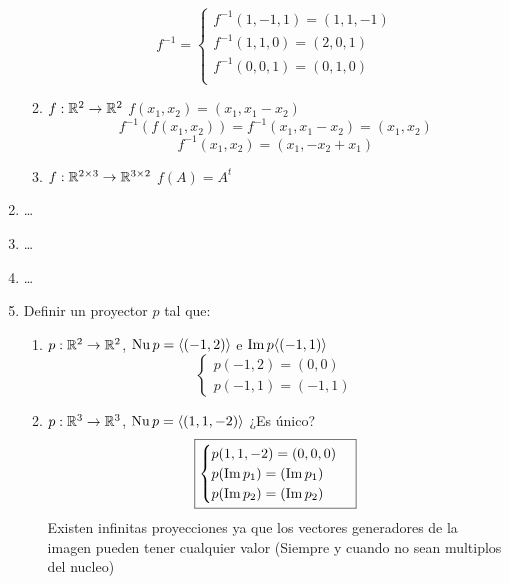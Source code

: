\documentclass[../practica.root.tex]{subfiles}
\begin{document}
\begin{enumerate}
\begin{enumerate}
                    \[
                        \boxed{
                            f^{-1} =
                            \begin{cases}
                                f^{-1}(1,-1,1) = (1,1,-1) \\
                                f^{-1}(1,1,0) = (2,0,1)   \\
                                f^{-1}(0,0,1) = (0,1,0)   \\
                            \end{cases}
                        }
                    \]
              \item $ f : \mathbb{R}^2 \to \mathbb{R}^2 $ $ f(x_1,x_2) = (x_1,x_1-x_2) $
                    \[ f^{-1}(f(x_1,x_2)) = f^{-1}(x_1, x_1 - x_2) = (x_1, x_2) \]
                    \[ \boxed{f^{-1}(x_1, x_2) = (x_1, -x_2 + x_1) } \]
              \item $ f : \mathbb{R}^{2\times3} \to \mathbb{R}^{3\times2} $ $ f(A) = A^t $
          \end{enumerate}
    \item \dots
    \item \dots
    \item \dots
    \item Definir un proyector $p$ tal que:
          \begin{enumerate}
              \item $ p : \mathbb{R}^2 \to \mathbb{R}^2 $, $ \operatorname{Nu} p = \langle (-1,2) \rangle $ e $ \operatorname{Im} p \langle (-1,1) \rangle $
                    \[
                        \boxed{
                            \begin{cases}
                                p(-1,2) = (0,0) \\
                                p(-1,1) = (-1,1)
                            \end{cases}
                        }
                    \]
              \item $ p : \mathbb{R}^3 \to \mathbb{R}^3 $, $ \operatorname{Nu} p = \langle (1,1,-2) \rangle $ ¿Es único?
                    \[
                        \boxed{
                            \begin{cases}
                                p(1,1,-2) = (0,0,0)      \\
                                p(\operatorname{Im} p_1) = (\operatorname{Im} p_1) \\
                                p(\operatorname{Im} p_2) = (\operatorname{Im} p_2)
                            \end{cases}
                        }
                    \]
                    Existen infinitas proyecciones ya que los vectores generadores de la imagen pueden tener cualquier valor (Siempre y cuando no sean multiplos del nucleo)

\end{enumerate}
\end{enumerate}
\end{document}
